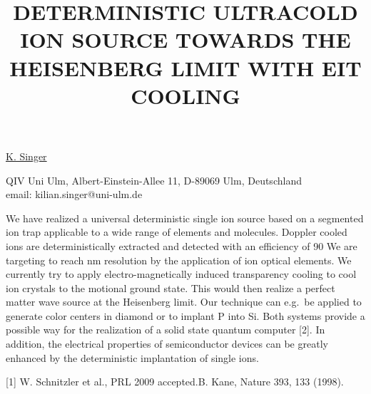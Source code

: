 \title{DETERMINISTIC ULTRACOLD ION SOURCE TOWARDS THE HEISENBERG LIMIT WITH EIT COOLING}

\underline{K. Singer}


QIV Uni Ulm,
Albert-Einstein-Allee 11,
D-89069 Ulm,
Deutschland\\
email: kilian.singer@uni-ulm.de

We have realized a universal deterministic single ion source based
on a segmented ion trap applicable to a wide range of elements and
molecules. Doppler cooled ions are deterministically extracted and
detected with an efficiency of 90%
We are targeting to reach nm resolution by the application of ion
optical elements. We currently try to apply electro-magnetically
induced transparency cooling to cool ion crystals to the motional
ground state. This would then realize a perfect matter wave source
at the Heisenberg limit. Our technique can e.g.~be applied to
generate color centers in diamond or to implant P into Si. Both
systems provide a possible way for the realization of a solid
state quantum computer [2]. In addition, the electrical properties
of semiconductor devices can be greatly enhanced by the
deterministic implantation of single ions.

[1] W. Schnitzler et al., PRL 2009 accepted.\newline
[2] B. Kane, Nature 393, 133 (1998).

\vspace{\baselineskip}